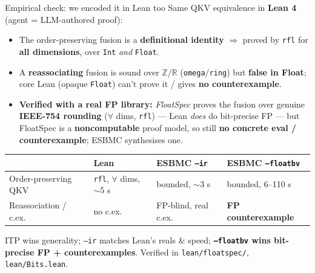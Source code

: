 \documentclass[aspectratio=169,11pt]{beamer}
\begin{document}
\begin{frame}{Empirical check: we encoded it in Lean too}
  Same QKV equivalence in \textbf{Lean 4} (agent = LLM-authored proof):
  \begin{itemize}
    \item The order-preserving fusion is a \textbf{definitional identity} $\Rightarrow$ proved by
      \texttt{rfl} for \textbf{all dimensions}, over \texttt{Int} \emph{and} \texttt{Float}.
    \item A \textbf{reassociating} fusion is sound over $\mathbb{Z}/\mathbb{R}$ (\texttt{omega}/\texttt{ring})
      but \textbf{false in Float}; core Lean (opaque \texttt{Float}) can't prove it / gives \textbf{no counterexample}.
    \item \textbf{Verified with a real FP library:} \emph{FloatSpec} proves the fusion over genuine
      \textbf{IEEE-754 rounding} ($\forall$ dims, \texttt{rfl}) --- Lean \emph{does} do bit-precise FP ---
      but FloatSpec is a \textbf{noncomputable} proof model, so still \textbf{no concrete eval /
      counterexample}; ESBMC synthesises one.
  \end{itemize}
  \vspace{-1mm}
  \begin{center}\footnotesize
  \begin{tabular}{@{}p{}p{}p{}p{}@{}}
    \toprule
     & \textbf{Lean} & \textbf{ESBMC \texttt{--ir}} & \textbf{ESBMC \texttt{--floatbv}} \\
    \midrule
    Order-preserving QKV & \texttt{rfl}, $\forall$ dims, $\sim$5 s & bounded, $\sim$3 s & bounded, 6--110 s \\
    Reassociation / c.ex. & no c.ex. & FP-blind, real c.ex. & \textbf{FP counterexample} \\
    \bottomrule
  \end{tabular}
  \end{center}
  {\footnotesize ITP wins generality; \texttt{--ir} matches Lean's reals \& speed;
  \textbf{\texttt{--floatbv} wins bit-precise FP {+} counterexamples}. Verified in \texttt{lean/floatspec/}, \texttt{lean/Bits.lean}.}
\end{frame}
\end{document}
